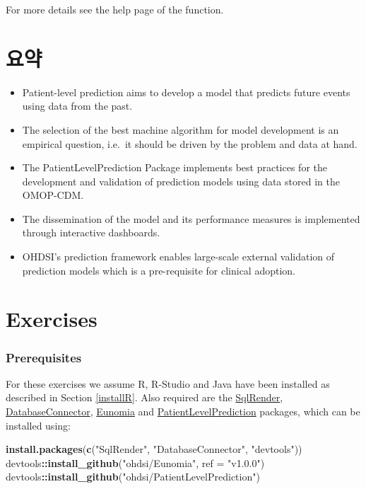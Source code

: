 \documentclass[11pt]{book}
\newenvironment{Shaded}{\begin{snugshade}}{\end{snugshade}}
\newcommand{\KeywordTok}[1]{\textcolor[rgb]{0.13,0.29,0.53}{\textbf{#1}}}
\newcommand{\DataTypeTok}[1]{\textcolor[rgb]{0.13,0.29,0.53}{#1}}
\newcommand{\StringTok}[1]{\textcolor[rgb]{0.31,0.60,0.02}{#1}}
\newcommand{\OperatorTok}[1]{\textcolor[rgb]{0.81,0.36,0.00}{\textbf{#1}}}
\newcommand{\NormalTok}[1]{#1}
\theoremstyle{definition}
\theoremstyle{definition}
\theoremstyle{definition}
\theoremstyle{remark}
\let\BeginKnitrBlock\begin \let\EndKnitrBlock\end
\begin{document}
For more details see the help page of the function.

\section{요약}\label{-11}

\BeginKnitrBlock{rmdsummary}
\begin{itemize}
\item
  Patient-level prediction aims to develop a model that predicts future
  events using data from the past.
\item
  The selection of the best machine algorithm for model development is
  an empirical question, i.e.~it should be driven by the problem and
  data at hand.
\item
  The PatientLevelPrediction Package implements best practices for the
  development and validation of prediction models using data stored in
  the OMOP-CDM.
\item
  The dissemination of the model and its performance measures is
  implemented through interactive dashboards.
\item
  OHDSI's prediction framework enables large-scale external validation
  of prediction models which is a pre-requisite for clinical adoption.
\end{itemize}
\EndKnitrBlock{rmdsummary}

\section{Exercises}\label{exercises}

\subsubsection*{Prerequisites}\label{prerequisites}

For these exercises we assume R, R-Studio and Java have been installed
as described in Section \ref{installR}. Also required are the
\href{https://ohdsi.github.io/SqlRender/}{SqlRender},
\href{https://ohdsi.github.io/DatabaseConnector/}{DatabaseConnector},
\href{https://ohdsi.github.io/Eunomia/}{Eunomia} and
\href{https://ohdsi.github.io/PatientLevelPrediction/}{PatientLevelPrediction}
packages, which can be installed using:

\begin{Shaded}
\begin{Highlighting}[]
\KeywordTok{install.packages}\NormalTok{(}\KeywordTok{c}\NormalTok{(}\StringTok{"SqlRender"}\NormalTok{, }\StringTok{"DatabaseConnector"}\NormalTok{, }\StringTok{"devtools"}\NormalTok{))}
\NormalTok{devtools}\OperatorTok{::}\KeywordTok{install_github}\NormalTok{(}\StringTok{"ohdsi/Eunomia"}\NormalTok{, }\DataTypeTok{ref =} \StringTok{"v1.0.0"}\NormalTok{)}
\NormalTok{devtools}\OperatorTok{::}\KeywordTok{install_github}\NormalTok{(}\StringTok{"ohdsi/PatientLevelPrediction"}\NormalTok{)}
\end{Highlighting}
\end{Shaded}
\end{document}
